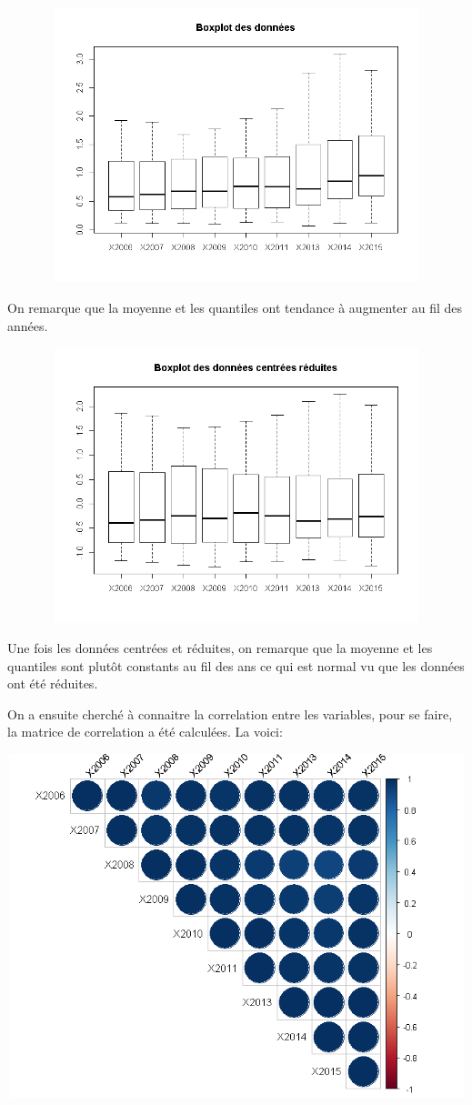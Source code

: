 \documentclass{article}
\begin{document}
 \includegraphics[width=15cm,height=8cm]{"Boxplot1"}
 
On remarque que la moyenne et les quantiles ont tendance à augmenter au fil des années.

 \includegraphics[width=15cm,height=8cm]{"Boxplot2"} 
 
Une fois les données centrées et réduites, on remarque que la moyenne et les quantiles sont plutôt constants au fil des ans ce qui est normal vu que les données ont été réduites.

 On a ensuite cherché à connaitre la correlation entre les variables, pour se faire, la matrice de correlation a été calculées.
 La voici:
 
 \includegraphics[width=15cm,height=10cm]{"Corr"}
 
\end{document}
